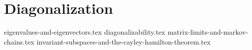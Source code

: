 \chapter{Diagonalization}
{eigenvalues-and-eigenvectors.tex}
{diagonalizability.tex}
{matrix-limits-and-markov-chains.tex}
{invariant-subspaces-and-the-cayley-hamilton-theorem.tex}
